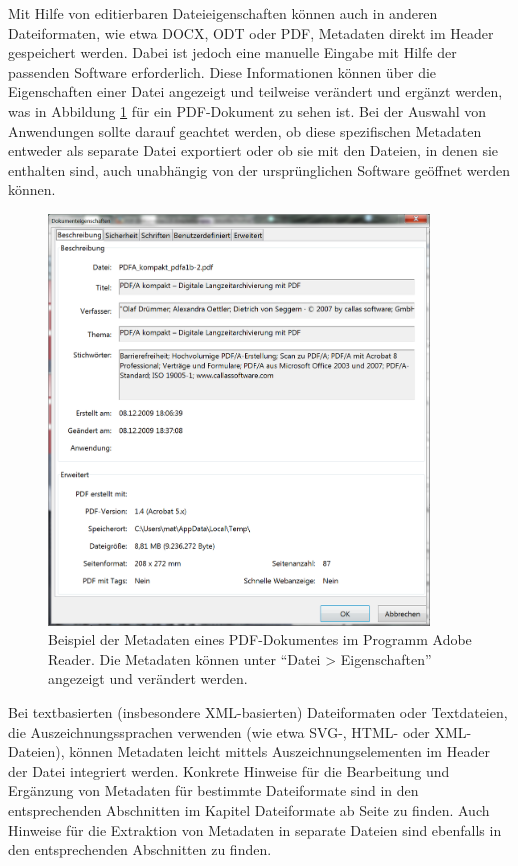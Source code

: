 Mit Hilfe von editierbaren Dateieigenschaften können auch in anderen Dateiformaten, wie etwa DOCX, ODT oder PDF, Metadaten direkt im Header gespeichert werden. Dabei ist jedoch eine manuelle Eingabe mit Hilfe der passenden Software erforderlich. Diese Informationen können über die Eigenschaften einer Datei angezeigt und teilweise verändert und ergänzt werden, was in Abbildung \ref{eigenschaftenAcrobat} für ein PDF-Dokument zu sehen ist. Bei der Auswahl von Anwendungen sollte darauf geachtet werden, ob diese spezifischen Metadaten entweder als separate Datei exportiert oder ob sie mit den Dateien, in denen sie enthalten sind, auch unabhängig von der ursprünglichen Software geöffnet werden können.

\begin{figure}[t!]
  \begin{center}
    \includegraphics[width=0.9\textwidth]{bilder/doku_AdobeEigenschaften}
  \end{center}
  \caption{Beispiel der Metadaten eines PDF-Dokumentes im Programm Adobe Reader. Die Metadaten können unter "`Datei > Eigenschaften"' angezeigt und verändert werden.}
  \label{eigenschaftenAcrobat}
\end{figure}

Bei textbasierten (insbesondere XML-basierten) Dateiformaten oder Textdateien, die Auszeichnungssprachen verwenden (wie etwa SVG-, HTML- oder XML-Dateien), können Metadaten leicht mittels Auszeichnungselementen im Header der Datei integriert werden. Konkrete Hinweise für die Bearbeitung und Ergänzung von Metadaten für bestimmte Dateiformate sind in den entsprechenden Abschnitten im Kapitel Dateiformate ab Seite \pageref{dateiformate} zu finden. Auch Hinweise für die Extraktion von Metadaten in separate Dateien sind ebenfalls in den entsprechenden Abschnitten zu finden.

